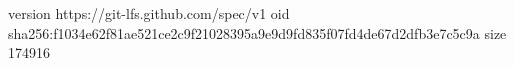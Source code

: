version https://git-lfs.github.com/spec/v1
oid sha256:f1034e62f81ae521ce2c9f21028395a9e9d9fd835f07fd4de67d2dfb3e7c5c9a
size 174916
